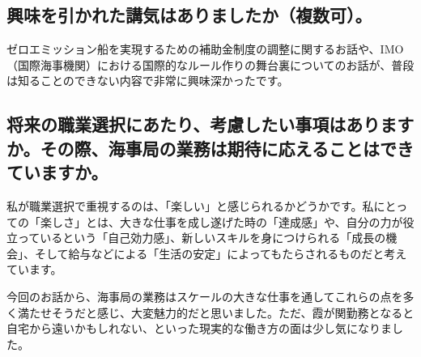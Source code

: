 \documentclass[dvipdfmx,a4paper]{jsarticle}
\begin{document}
\subsection{興味を引かれた講気はありましたか（複数可）。}
ゼロエミッション船を実現するための補助金制度の調整に関するお話や、IMO（国際海事機関）における国際的なルール作りの舞台裏についてのお話が、普段は知ることのできない内容で非常に興味深かったです。

\subsection{将来の職業選択にあたり、考慮したい事項はありますか。その際、海事局の業務は期待に応えることはできていますか。}
私が職業選択で重視するのは、「楽しい」と感じられるかどうかです。私にとっての「楽しさ」とは、大きな仕事を成し遂げた時の「達成感」や、自分の力が役立っているという「自己効力感」、新しいスキルを身につけられる「成長の機会」、そして給与などによる「生活の安定」によってもたらされるものだと考えています。

今回のお話から、海事局の業務はスケールの大きな仕事を通してこれらの点を多く満たせそうだと感じ、大変魅力的だと思いました。ただ、霞が関勤務となると自宅から遠いかもしれない、といった現実的な働き方の面は少し気になりました。
\end{document}
